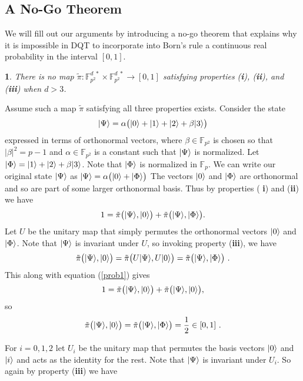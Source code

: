 \documentclass[english,12pt]{iopart}
\makeatletter
\theoremstyle{plain}
\newtheorem{thm}{\protect\theoremname}
\newenvironment{proof}[1][\protect\proofname]{\par
\normalfont\topsep6\p@\@plus6\p@\relax
\trivlist
\itemindent\parindent
\item[\hskip\labelsep\scshape #1]\ignorespaces
}{%
\endtrivlist\@endpefalse
}
\providecommand{\proofname}{Proof}
\theoremstyle{definition}
\newcommand{\ff}[1]{\mathbb{F}_{#1}}
\newcommand{\ffzd}[1]{{\mathbb{F}^{d\;*}_{#1}}}
\newcommand{\dpt}{{\tilde{\pi}}}
\providecommand{\theoremname}{Theorem}
\makeatother
\begin{document}
\subsection{A No-Go Theorem}

We will fill out our arguments by introducing a no-go theorem that
explains why it is impossible in DQT to incorporate into Born's rule a
continuous real probability in the interval $[0,1]$.

\begin{thm}
\label{theorem1} There is no map $\dpt\colon\ffzd{p^{2}}\times\ffzd{p^{2}}\longrightarrow[0,1]$
satisfying properties ({\bf i}), ({\bf ii}), and ({\bf iii})
when $d>3$. \end{thm}
%
\begin{proof}
Assume such a map $\dpt$ satisfying all three properties exists.
Consider the state 
\[
{\left\vert{\Psi}\right\rangle}=\alpha\big({\left\vert{0}\right\rangle}+{\left\vert{1}\right\rangle}+{\left\vert{2}\right\rangle}+\beta{\left\vert{3}\right\rangle}\big)
\]
expressed in terms of orthonormal vectors, where $\beta\in\ff{p^{2}}$
is chosen so that $\left|\beta\right|^{2}=p-1$ and $\alpha\in\ff{p^{2}}$
is a constant such that ${\left\vert{\Psi}\right\rangle}$ is normalized. Let ${\left\vert{\Phi}\right\rangle}={\left\vert{1}\right\rangle}+{\left\vert{2}\right\rangle}+\beta{\left\vert{3}\right\rangle}$.
Note that ${\left\vert{\Phi}\right\rangle}$ is normalized in $\ff{p}$. We can write our
original state ${\left\vert{\Psi}\right\rangle}$ as ${\left\vert{\Psi}\right\rangle}=\alpha\big({\left\vert{0}\right\rangle}+{\left\vert{\Phi}\right\rangle}\big)$
The vectors ${\left\vert{0}\right\rangle}$ and ${\left\vert{\Phi}\right\rangle}$ are orthonormal and so are
part of some larger orthonormal basis. Thus by properties ({\bf
i}) and ({\bf ii}) we have 
\begin{equation}
1=\dpt\big(\ket{\Psi},\ket{0}\big)+\dpt\big(\ket{\Psi},\ket{\Phi}\big).\label{prob1}
\end{equation}
Let $U$ be the unitary map that simply permutes the orthonormal vectors
${\left\vert{0}\right\rangle}$ and ${\left\vert{\Phi}\right\rangle}$. Note that ${\left\vert{\Psi}\right\rangle}$ is invariant
under $U$, so invoking property ({\bf iii}), we have 
\[
\dpt\big(\ket{\Psi},\ket{0}\big)=\dpt\big(U\ket{\Psi},U\ket{0}\big)=\dpt\big(\ket{\Psi},\ket{\Phi}\big)\ .
\]
This along with equation (\ref{prob1}) gives 
\[
1=\dpt\big(\ket{\Psi},\ket{0}\big)+\dpt\big(\ket{\Psi},\ket{0}\big),
\]
so 
\begin{equation}
\dpt\big(\ket{\Psi},\ket{0}\big)=\dpt\big(\ket{\Psi},\ket{\Phi}\big)=\frac{1}{2}\in[0,1]\ .\label{prob2}
\end{equation}
\par For $i=0,1,2$ let $U_{i}$ be the unitary map that permutes
the basis vectors ${\left\vert{0}\right\rangle}$ and ${\left\vert{i}\right\rangle}$ and acts as the identity
for the rest. Note that ${\left\vert{\Psi}\right\rangle}$ is invariant under $U_{i}$.
So again by property ({\bf iii}) we have 

\end{proof}
\end{document}

